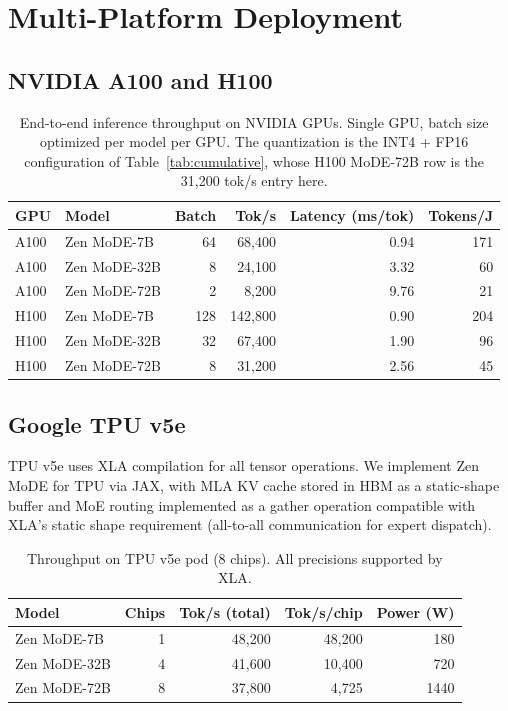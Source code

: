 \documentclass[11pt,a4paper]{article}
\begin{document}
\section{Multi-Platform Deployment}
\label{sec:platforms}

\subsection{NVIDIA A100 and H100}

\begin{table}[H]
\centering
\caption{End-to-end inference throughput on NVIDIA GPUs. Single GPU, batch size
optimized per model per GPU. The quantization is the INT4 + FP16 configuration of
Table~\ref{tab:cumulative}, whose H100 MoDE-72B row is the 31,200 tok/s entry here.}
\begin{tabular}{llrrrr}
\toprule
\textbf{GPU} & \textbf{Model} & \textbf{Batch} & \textbf{Tok/s} & \textbf{Latency (ms/tok)} & \textbf{Tokens/J} \\
\midrule
A100 & Zen MoDE-7B  & 64  & 68,400  & 0.94  & 171 \\
A100 & Zen MoDE-32B & 8   & 24,100  & 3.32  & 60  \\
A100 & Zen MoDE-72B & 2   & 8,200   & 9.76  & 21  \\
H100 & Zen MoDE-7B  & 128 & 142,800 & 0.90  & 204 \\
H100 & Zen MoDE-32B & 32  & 67,400  & 1.90  & 96  \\
H100 & Zen MoDE-72B & 8   & 31,200  & 2.56  & 45  \\
\bottomrule
\end{tabular}
\label{tab:gpu_throughput}
\end{table}

\subsection{Google TPU v5e}

TPU v5e uses XLA compilation for all tensor operations. We implement Zen MoDE for
TPU via JAX, with MLA KV cache stored in HBM as a static-shape buffer and MoE
routing implemented as a gather operation compatible with XLA's static shape
requirement (all-to-all communication for expert dispatch).

\begin{table}[H]
\centering
\caption{Throughput on TPU v5e pod (8 chips). All precisions supported by XLA.}
\begin{tabular}{lrrrr}
\toprule
\textbf{Model} & \textbf{Chips} & \textbf{Tok/s (total)} & \textbf{Tok/s/chip} & \textbf{Power (W)} \\
\midrule
Zen MoDE-7B  & 1 & 48,200 & 48,200 & 180 \\
Zen MoDE-32B & 4 & 41,600 & 10,400 & 720 \\
Zen MoDE-72B & 8 & 37,800 & 4,725  & 1440 \\
\bottomrule
\end{tabular}
\label{tab:tpu}
\end{table}
\end{document}
